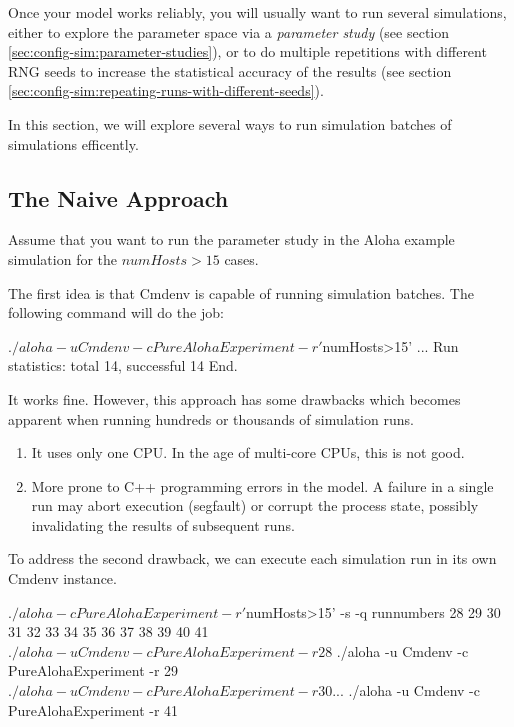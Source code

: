 Once your model works reliably, you will usually want to run several
simulations, either to explore the parameter space via a \textit{parameter
study} (see section \ref{sec:config-sim:parameter-studies}), or to do 
multiple repetitions with different RNG seeds to increase the statistical
accuracy of the results (see section
\ref{sec:config-sim:repeating-runs-with-different-seeds}). 

In this section, we will explore several ways to run simulation batches of
simulations efficently.

\subsection{The Naive Approach}
\label{sec:run-sim:campaigns-naive-approach}

Assume that you want to run the parameter study in the Aloha example
simulation for the $numHosts>15$ cases. 

The first idea is that Cmdenv is capable of running simulation batches. 
The following command will do the job:

\begin{commandline}
$ ./aloha -u Cmdenv -c PureAlohaExperiment -r '$numHosts>15'
...
Run statistics: total 14, successful 14
End.
\end{commandline}
 
It works fine. However, this approach has some drawbacks which becomes
apparent when running hundreds or thousands of simulation runs.

\begin{enumerate}
  \item It uses only one CPU. In the age of multi-core CPUs, this is not good.
  \item More prone to C++ programming errors in the model. A failure in a single
        run may abort execution (segfault) or corrupt the process
        state, possibly invalidating the results of subsequent runs.
\end{enumerate}

To address the second drawback, we can execute each simulation run in its own
Cmdenv instance.

\begin{commandline}
$ ./aloha -c PureAlohaExperiment -r '$numHosts>15' -s -q runnumbers
28 29 30 31 32 33 34 35 36 37 38 39 40 41
$ ./aloha -u Cmdenv -c PureAlohaExperiment -r 28
$ ./aloha -u Cmdenv -c PureAlohaExperiment -r 29
$ ./aloha -u Cmdenv -c PureAlohaExperiment -r 30
...
$ ./aloha -u Cmdenv -c PureAlohaExperiment -r 41
\end{commandline}

